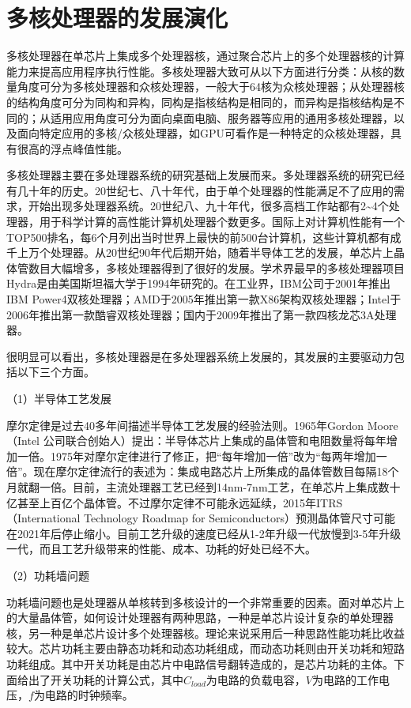 \documentclass[]{ctexbook}
\begin{document}
\hypertarget{ux591aux6838ux5904ux7406ux5668ux7684ux53d1ux5c55ux6f14ux5316}{%
\section{多核处理器的发展演化}\label{ux591aux6838ux5904ux7406ux5668ux7684ux53d1ux5c55ux6f14ux5316}}

多核处理器在单芯片上集成多个处理器核，通过聚合芯片上的多个处理器核的计算能力来提高应用程序执行性能。多核处理器大致可从以下方面进行分类：从核的数量角度可分为多核处理器和众核处理器，一般大于64核为众核处理器；从处理器核的结构角度可分为同构和异构，同构是指核结构是相同的，而异构是指核结构是不同的；从适用应用角度可分为面向桌面电脑、服务器等应用的通用多核处理器，以及面向特定应用的多核/众核处理器，如GPU可看作是一种特定的众核处理器，具有很高的浮点峰值性能。

多核处理器主要在多处理器系统的研究基础上发展而来。多处理器系统的研究已经有几十年的历史。20世纪七、八十年代，由于单个处理器的性能满足不了应用的需求，开始出现多处理器系统。20世纪八、九十年代，很多高档工作站都有2\textasciitilde4个处理器，用于科学计算的高性能计算机处理器个数更多。国际上对计算机性能有一个TOP500排名，每6个月列出当时世界上最快的前500台计算机，这些计算机都有成千上万个处理器。从20世纪90年代后期开始，随着半导体工艺的发展，单芯片上晶体管数目大幅增多，多核处理器得到了很好的发展。学术界最早的多核处理器项目Hydra是由美国斯坦福大学于1994年研究的。在工业界，IBM公司于2001年推出IBM Power4双核处理器；AMD于2005年推出第一款X86架构双核处理器；Intel于2006年推出第一款酷睿双核处理器；国内于2009年推出了第一款四核龙芯3A处理器。

很明显可以看出，多核处理器是在多处理器系统上发展的，其发展的主要驱动力包括以下三个方面。

（1）半导体工艺发展

摩尔定律是过去40多年间描述半导体工艺发展的经验法则。1965年Gordon Moore（Intel 公司联合创始人）提出：半导体芯片上集成的晶体管和电阻数量将每年增加一倍。1975年对摩尔定律进行了修正，把``每年增加一倍''改为``每两年增加一倍''。现在摩尔定律流行的表述为：集成电路芯片上所集成的晶体管数目每隔18个月就翻一倍。目前，主流处理器工艺已经到14nm-7nm工艺，在单芯片上集成数十亿甚至上百亿个晶体管。不过摩尔定律不可能永远延续，2015年ITRS（International Technology Roadmap for Semiconductors）预测晶体管尺寸可能在2021年后停止缩小。目前工艺升级的速度已经从1-2年升级一代放慢到3-5年升级一代，而且工艺升级带来的性能、成本、功耗的好处已经不大。

（2）功耗墙问题

功耗墙问题也是处理器从单核转到多核设计的一个非常重要的因素。面对单芯片上的大量晶体管，如何设计处理器有两种思路，一种是单芯片设计复杂的单处理器核，另一种是单芯片设计多个处理器核。理论来说采用后一种思路性能功耗比收益较大。芯片功耗主要由静态功耗和动态功耗组成，而动态功耗则由开关功耗和短路功耗组成。其中开关功耗是由芯片中电路信号翻转造成的，是芯片功耗的主体。下面给出了开关功耗的计算公式，其中\(C_{load}\)为电路的负载电容，\(V\)为电路的工作电压，\(f\)为电路的时钟频率。
\end{document}
